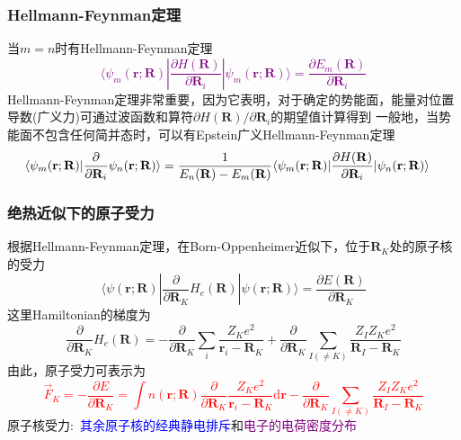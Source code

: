{\frame
{
	\frametitle{\textrm{Hellmann-Feynman}定理}
	当$m=n$时有\textrm{Hellmann-Feynman}定理
	\textcolor{purple}{
	\begin{displaymath}
		\langle\psi_m(\mathbf{r};\mathbf{R})|\dfrac{\partial H(\mathbf{R})}{\partial{\mathbf{R}_i}}|\psi_m(\mathbf{r};\mathbf{R})\rangle=\dfrac{\partial E_m(\mathbf{R})}{\partial\mathbf{R}_i}
	\end{displaymath}}
	\textrm{Hellmann-Feynman}定理非常重要，因为它表明，对于确定的势能面，能量对位置导数(广义力)可通过波函数和算符$\partial H(\mathbf{R})/\partial\mathbf{R}_i$的期望值计算得到
	\vskip 5pt
	一般地，当势能面不包含任何简并态时，可以有\textrm{Epstein}广义\textrm{Hellmann-Feynman}定理
	\begin{displaymath}
		\hspace*{-10pt}
		\langle\psi_m(\mathbf{r};\mathbf{R})|\dfrac{\partial}{\partial{\mathbf{R}_i}}\psi_n(\mathbf{r};\mathbf{R})\rangle=\dfrac1{E_n(\mathbf{R})-E_m(\mathbf{R})}\langle\psi_m(\mathbf{r};\mathbf{R})|\dfrac{\partial H(\mathbf{R})}{\partial{\mathbf{R}_i}}|\psi_n(\mathbf{r};\mathbf{R})\rangle
	\end{displaymath}
}

\frame
{
	\frametitle{绝热近似下的原子受力}
	根据\textrm{Hellmann-Feynman}定理，在\textrm{Born-Oppenheimer}近似下，位于$\mathbf{R}_K$处的原子核的受力
	\begin{displaymath}
		\langle\psi(\mathbf{r};\mathbf{R})|\dfrac{\partial}{\partial{\mathbf{R}_K}}H_e(\mathbf{R})|\psi(\mathbf{r};\mathbf{R})\rangle=\dfrac{\partial E(\mathbf{R})}{\partial\mathbf{R}_K}
	\end{displaymath}
	这里\textrm{Hamiltonian}的梯度为
	\begin{displaymath}
		\dfrac{\partial}{\partial{\mathbf{R}_K}}H_e(\mathbf{R})=-\dfrac{\partial}{\partial{\mathbf{R}_K}}\sum_i\dfrac{Z_Ke^2}{\mathbf{r}_i-\mathbf{R}_K}+\dfrac{\partial}{\partial{\mathbf{R}_K}}\sum_{I(\neq K)}\dfrac{Z_IZ_Ke^2}{\mathbf{R}_I-\mathbf{R}_K}
	\end{displaymath}
	由此，原子受力可表示为
	\textcolor{red}{
	\begin{displaymath}
		\vec F_K=-\dfrac{\partial E}{\partial\mathbf{R}_K}=\int n(\mathbf{r};\mathbf{R})\dfrac{\partial}{\partial{\mathbf{R}_K}}\dfrac{Z_Ke^2}{\mathbf{r}_i-\mathbf{R}_K}\mathrm{d}\mathbf{r}-\dfrac{\partial}{\partial{\mathbf{R}_K}}\sum_{I(\neq K)}\dfrac{Z_IZ_Ke^2}{\mathbf{R}_I-\mathbf{R}_K}
	\end{displaymath}}
	原子核受力:~\textcolor{blue}{其余原子核的经典静电排斥}和\textcolor{purple}{电子的电荷密度分布}
}

}
